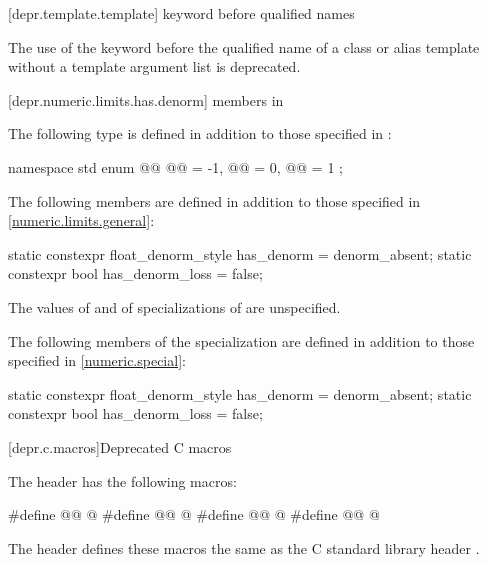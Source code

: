 [depr.template.template]{ keyword before qualified names}

\pnum
The use of the keyword 
before the qualified name of a class or alias template
without a template argument list is deprecated.

[depr.numeric.limits.has.denorm]{ members in }

\pnum
The following type is defined
in addition to those specified in :
\begin{codeblock}
namespace std {
  enum @@ {
    @@ = -1,
    @@ = 0,
    @@ = 1
  };
}
\end{codeblock}

\pnum
{}%
%
%
%
The following members are defined
in addition to those specified in \ref{numeric.limits.general}:
\begin{codeblock}
static constexpr float_denorm_style has_denorm = denorm_absent;
static constexpr bool has_denorm_loss = false;
\end{codeblock}

\pnum
The values of  and  of
specializations of  are unspecified.

\pnum
The following members of the specialization  are defined
in addition to those specified in \ref{numeric.special}:
%
%
\begin{codeblock}
static constexpr float_denorm_style has_denorm = denorm_absent;
static constexpr bool has_denorm_loss = false;
\end{codeblock}

[depr.c.macros]{Deprecated C macros}

\pnum
The header  has the following macros:
\begin{codeblock}
#define @@ @\seebelow@
#define @@ @\seebelow@
#define @@ @\seebelow@
#define @@ @\seebelow@
\end{codeblock}
The header defines these macros the same as
the C standard library header .

